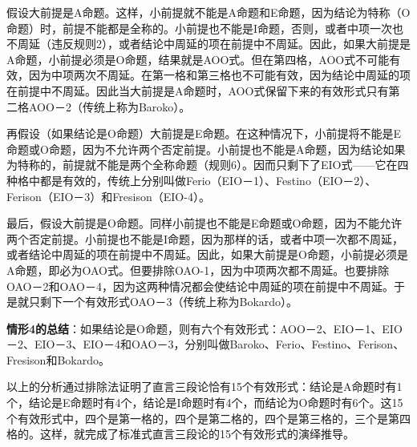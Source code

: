 假设大前提是A命题。这样，小前提就不能是A命题和E命题，因为结论为特称（O命题）时，前提不能都是全称的。小前提也不能是I命题，否则，或者中项一次也不周延（违反规则2），或者结论中周延的项在前提中不周延。因此，如果大前提是A命题，小前提必须是O命题，结果就是AOO式。但在第四格，AOO式不可能有效，因为中项两次不周延。在第一格和第三格也不可能有效，因为结论中周延的项在前提中不周延。因此当大前提是A命题时，AOO式保留下来的有效形式只有第二格AOO－2（传统上称为Baroko）。

再假设（如果结论是O命题）大前提是E命题。在这种情况下，小前提将不能是E命题或O命题，因为不允许两个否定前提。小前提也不能是A命题，因为结论如果为特称的，前提就不能是两个全称命题（规则6）。因而只剩下了EIO式——它在四种格中都是有效的，传统上分别叫做Ferio（EIO－1）、Festino（EIO－2）、Ferison（EIO－3）和Fresison（EIO-4）。

最后，假设大前提是O命题。同样小前提也不能是E命题或O命题，因为不能允许两个否定前提。小前提也不能是I命题，因为那样的话，或者中项一次都不周延，或者结论中周延的项在前提中不周延。因此，如果大前提是O命题，小前提必须是A命题，即必为OAO式。但要排除OAO-1，因为中项两次都不周延。也要排除OAO－2和OAO－4，因为这两种情况都会使结论中周延的项在前提中不周延。于是就只剩下一个有效形式OAO－3（传统上称为Bokardo）。

\textbf{情形4的总结}：如果结论是O命题，则有六个有效形式：AOO－2、EIO－1、EIO－2、EIO－3、EIO－4和OAO－3，分别叫做Baroko、Ferio、Festino、Ferison、Fresison和Bokardo。

以上的分析通过排除法证明了直言三段论恰有15个有效形式：结论是A命题时有1个，结论是E命题时有4个，结论是I命题时有4个，而结论为O命题时有6个。这15个有效形式中，四个是第一格的，四个是第二格的，四个是第三格的，三个是第四格的。这样，就完成了标准式直言三段论的15个有效形式的演绎推导。


